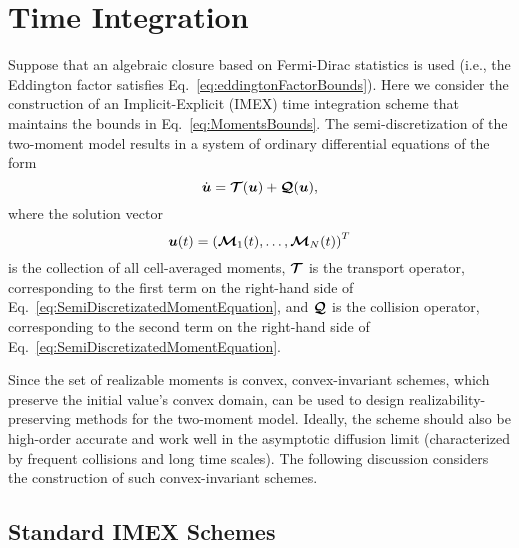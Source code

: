 \section{Time Integration} \label{se:TimeIntegration}

Suppose that an algebraic closure based on Fermi-Dirac statistics is used (i.e., the Eddington factor satisfies Eq.~\eqref{eq:eddingtonFactorBounds}).
Here we consider the construction of an Implicit-Explicit (IMEX) time integration scheme that maintains the bounds in Eq.~\eqref{eq:MomentsBounds}.  
The semi-discretization of the two-moment model results in a system of ordinary differential equations of the form
\begin{equation}
  \dot{\boldsymbol{u}} = \boldsymbol{\mathcal{T}}(\boldsymbol{u}) + \boldsymbol{\mathcal{Q}}(\boldsymbol{u}),
\end{equation}
where the solution vector
\begin{equation}
  \boldsymbol{u}(t) = \left( \boldsymbol{\mathcal{M}}_{1}(t),\ldots,\boldsymbol{\mathcal{M}}_{N}(t)\right) ^{T}
\end{equation}
is the collection of all cell-averaged moments, $\boldsymbol{\mathcal{T}}$ is the transport operator, corresponding to the first term on the right-hand side of Eq.~\eqref{eq:SemiDiscretizatedMomentEquation}, and $\boldsymbol{\mathcal{Q}}$ is the collision operator, corresponding to the second term on the right-hand side of Eq.~\eqref{eq:SemiDiscretizatedMomentEquation}.  

Since the set of realizable moments is convex, convex-invariant schemes, which preserve the initial value's convex domain, can be used to design realizability-preserving methods for the two-moment model. 
Ideally, the scheme should also be high-order accurate and work well in the asymptotic diffusion limit (characterized by frequent collisions and long time scales).  
The following discussion considers the construction of such convex-invariant schemes.  

\subsection{Standard IMEX Schemes}

